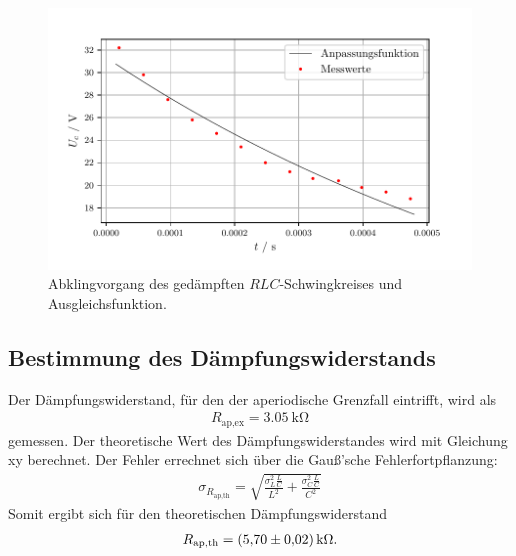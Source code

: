 \begin{figure}[H]
  \centering
  \includegraphics{plota.pdf}
  \caption{Abklingvorgang des gedämpften $\mathit{RLC}$-Schwingkreises und Ausgleichsfunktion.}
  \label{fig:Plot a}
\end{figure}

\subsection{Bestimmung des Dämpfungswiderstands }
Der Dämpfungswiderstand, für den der aperiodische Grenzfall eintrifft, wird als 
\begin{align*}
R_\text{ap,ex} = \SI{3,05}{\kilo\ohm}
\end{align*}
gemessen.
Der theoretische Wert des Dämpfungswiderstandes wird mit Gleichung xy berechnet.
Der Fehler errechnet sich über die Gauß'sche Fehlerfortpflanzung:
\begin{align*}
\sigma_{R_\text{ap,th}} = \sqrt{\frac{\sigma_{L}^{2}\frac{L}{C}}{L^{2}} + \frac{\sigma_{C}^{2} \frac{L}{C}}{C^{2}}}
\end{align*}
Somit ergibt sich für den theoretischen Dämpfungswiderstand
\begin{align*}
R_\text{ap,th} = \SI{5.7 \pm 0.02}{\kilo\ohm}.
\end{align*}

